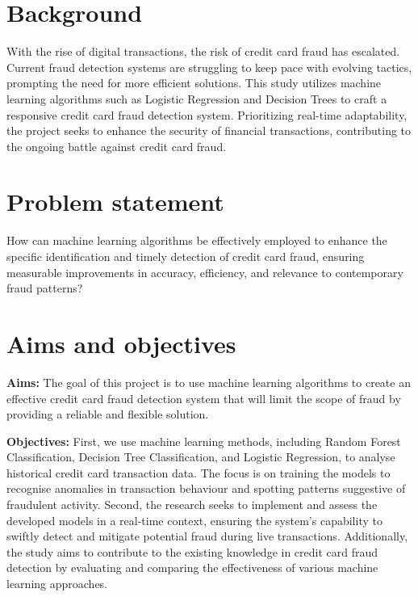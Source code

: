 \section{Background}
\label{sec:into_back}

With the rise of digital transactions, the risk of credit card fraud has escalated. Current 
fraud detection systems are struggling to keep pace with evolving tactics, prompting 
the need for more efficient solutions. This study utilizes machine learning algorithms such as 
Logistic Regression and Decision Trees to craft a responsive credit card fraud 
detection system. Prioritizing real-time adaptability, the project seeks to enhance the 
security of financial transactions, contributing to the ongoing battle against credit card 
fraud.

\section{Problem statement}
\label{sec:intro_prob_art}
How can machine learning algorithms be effectively employed to enhance the specific identification and timely detection of credit card fraud, ensuring measurable improvements in accuracy, efficiency, and relevance to contemporary fraud patterns?

\section{Aims and objectives}
\label{sec:intro_aims_obj}


\textbf{Aims:} The goal of this project is to use machine learning algorithms to create an effective credit card fraud detection system that will limit the scope of fraud by providing a reliable and flexible solution.




\textbf{Objectives:} First, we use machine learning methods, including Random Forest Classification, Decision Tree Classification, and Logistic Regression, to analyse historical credit card transaction data. The focus is on training the models to recognise anomalies in transaction behaviour and spotting patterns suggestive of fraudulent activity. Second, the research seeks to implement and assess the developed models in a real-time context, ensuring the system's capability to swiftly detect and mitigate potential fraud during 
live transactions. Additionally, the study aims to contribute to the existing knowledge in credit card fraud detection by evaluating and comparing the effectiveness of various 
machine learning approaches.



